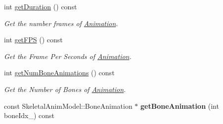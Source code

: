 \begin{DoxyCompactItemize}
int \hyperlink{class_magnum_1_1endif_1_1_resource_acd95fdd52b9aa40dc2c9bdb05067d34c}{get\+Duration} () const 
\begin{DoxyCompactList}\small\item\em Get the number frames of \hyperlink{class_magnum_1_1endif_1_1_animation}{Animation}. \end{DoxyCompactList}\item 
int \hyperlink{class_magnum_1_1endif_1_1_resource_a272295e842645b68d444c78921a44229}{get\+F\+PS} () const 
\begin{DoxyCompactList}\small\item\em Get the Frame Per Seconds of \hyperlink{class_magnum_1_1endif_1_1_animation}{Animation}. \end{DoxyCompactList}\item 
int \hyperlink{class_magnum_1_1endif_1_1_resource_a7442b235381d103bf65ffcb341a02c02}{get\+Num\+Bone\+Animations} () const 
\begin{DoxyCompactList}\small\item\em Get the Number of Bones of \hyperlink{class_magnum_1_1endif_1_1_animation}{Animation}. \end{DoxyCompactList}\item 
const Skeletal\+Anim\+Model\+::\+Bone\+Animation $\ast$ {\bfseries get\+Bone\+Animation} (int bone\+Idx\+\_\+) const \hypertarget{class_magnum_1_1endif_1_1_resource_a4cbb425335dd1e189594f143fa1ff3ff}{}\label{class_magnum_1_1endif_1_1_resource_a4cbb425335dd1e189594f143fa1ff3ff}


\end{DoxyCompactItemize}
